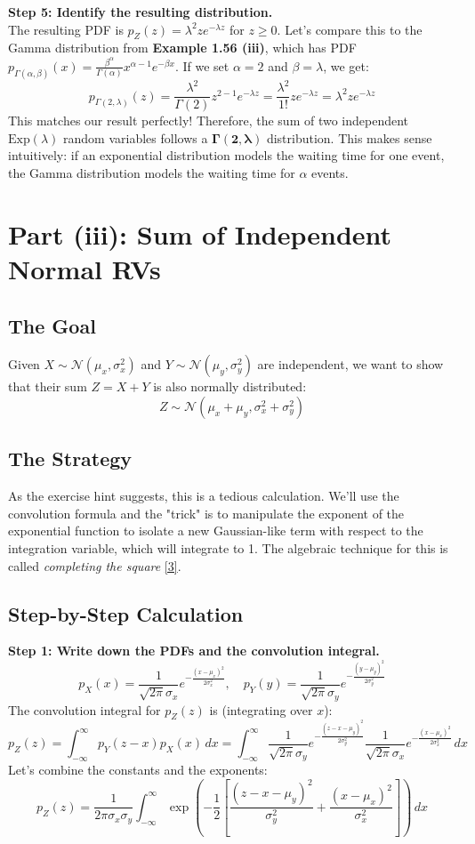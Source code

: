 \documentclass[11pt,a4paper]{article}
\begin{document}
\noindent\textbf{Step 5: Identify the resulting distribution.} \\
The resulting PDF is $p_Z(z) = \lambda^2 z e^{-\lambda z}$ for $z \ge 0$. Let's compare this to the Gamma distribution from \textbf{Example 1.56 (iii)}, which has PDF $p_{\Gamma(\alpha,\beta)}(x) = \frac{\beta^\alpha}{\Gamma(\alpha)} x^{\alpha-1} e^{-\beta x}$.
If we set $\alpha=2$ and $\beta=\lambda$, we get:
\[
p_{\Gamma(2,\lambda)}(z) = \frac{\lambda^2}{\Gamma(2)} z^{2-1} e^{-\lambda z} = \frac{\lambda^2}{1!} z e^{-\lambda z} = \lambda^2 z e^{-\lambda z}
\]
This matches our result perfectly! Therefore, the sum of two independent $\text{Exp}(\lambda)$ random variables follows a $\mathbf{\Gamma(2, \lambda)}$ distribution. This makes sense intuitively: if an exponential distribution models the waiting time for one event, the Gamma distribution models the waiting time for $\alpha$ events.

\section{Part (iii): Sum of Independent Normal RVs}

\subsection{The Goal}
Given $X \sim \mathcal{N}(\mu_x, \sigma_x^2)$ and $Y \sim \mathcal{N}(\mu_y, \sigma_y^2)$ are independent, we want to show that their sum $Z = X+Y$ is also normally distributed:
\[
Z \sim \mathcal{N}(\mu_x + \mu_y, \sigma_x^2 + \sigma_y^2)
\]

\subsection{The Strategy}
As the exercise hint suggests, this is a tedious calculation. We'll use the convolution formula and the "trick" is to manipulate the exponent of the exponential function to isolate a new Gaussian-like term with respect to the integration variable, which will integrate to 1. The algebraic technique for this is called \textit{completing the square} \hyperlink{note_square}{[3]}.

\subsection{Step-by-Step Calculation}
\noindent\textbf{Step 1: Write down the PDFs and the convolution integral.}
\[
p_X(x) = \frac{1}{\sqrt{2\pi}\sigma_x} e^{-\frac{(x-\mu_x)^2}{2\sigma_x^2}}, \quad p_Y(y) = \frac{1}{\sqrt{2\pi}\sigma_y} e^{-\frac{(y-\mu_y)^2}{2\sigma_y^2}}
\]
The convolution integral for $p_Z(z)$ is (integrating over $x$):
\[
p_Z(z) = \int_{-\infty}^{\infty} p_Y(z-x) p_X(x) \, dx = \int_{-\infty}^{\infty} \frac{1}{\sqrt{2\pi}\sigma_y} e^{-\frac{(z-x-\mu_y)^2}{2\sigma_y^2}} \frac{1}{\sqrt{2\pi}\sigma_x} e^{-\frac{(x-\mu_x)^2}{2\sigma_x^2}} \, dx
\]
Let's combine the constants and the exponents:
\[
p_Z(z) = \frac{1}{2\pi\sigma_x\sigma_y} \int_{-\infty}^{\infty} \exp\left( -\frac{1}{2} \left[ \frac{(z-x-\mu_y)^2}{\sigma_y^2} + \frac{(x-\mu_x)^2}{\sigma_x^2} \right] \right) \, dx
\]
\end{document}
